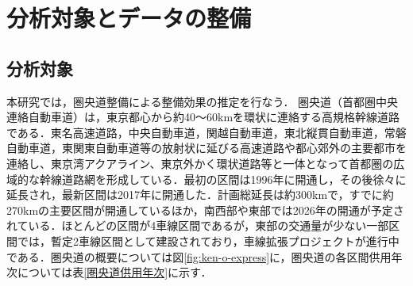 \chapter{分析対象とデータの整備}

\section{分析対象}

本研究では，圏央道整備による整備効果の推定を行なう．
圏央道（首都圏中央連絡自動車道）は，東京都心から約40〜60kmを環状に連絡する高規格幹線道路である．東名高速道路，中央自動車道，関越自動車道，東北縦貫自動車道，常磐自動車道，東関東自動車道等の放射状に延びる高速道路や都心郊外の主要都市を連絡し、東京湾アクアライン、東京外かく環状道路等と一体となって首都圏の広域的な幹線道路網を形成している\cite{kokudo2024}．最初の区間は1996年に開通し，その後徐々に延長され，最新区間は2017年に開通した．計画総延長は約300kmで，すでに約270kmの主要区間が開通しているほか，南西部や東部では2026年の開通が予定されている．ほとんどの区間が4車線区間であるが，東部の交通量が少ない一部区間では，暫定2車線区間として建設されており，車線拡張プロジェクトが進行中である．圏央道の概要については図\ref{fig:ken-o-express}に，圏央道の各区間供用年次については表\ref{圏央道供用年次}に示す．


